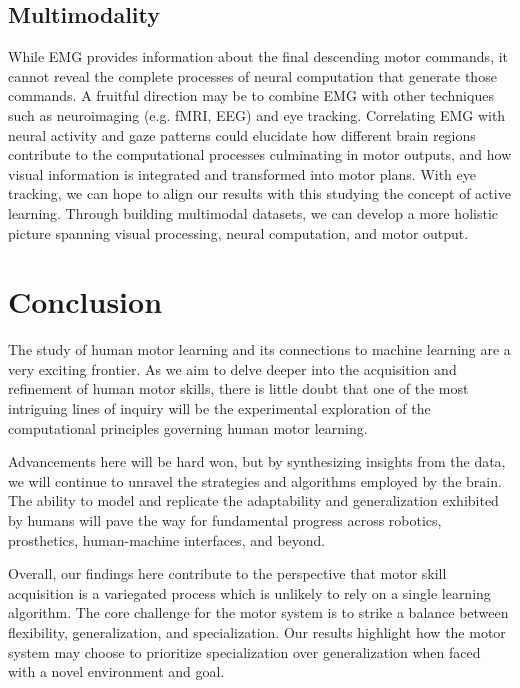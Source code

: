 \documentclass[../main.tex]{subfiles}
\begin{document}


\subsection{Multimodality}

While EMG provides information about the final descending motor commands, it cannot reveal the complete processes of neural computation that generate those commands. A fruitful direction may be to combine EMG with other techniques such as neuroimaging (e.g. fMRI, EEG) and eye tracking. Correlating EMG with neural activity and gaze patterns could elucidate how different brain regions contribute to the computational processes culminating in motor outputs, and how visual information is integrated and transformed into motor plans. With eye tracking, we can hope to align our results with this studying the concept of active learning\cite{yangTheoreticalPerspectivesActive2016,huangActiveLearningLearning2008}. Through building multimodal datasets, we can develop a more holistic picture spanning visual processing, neural computation, and motor output.








\section{Conclusion} %

The study of human motor learning and its connections to machine learning are a very exciting frontier. As we aim to delve deeper into the acquisition and refinement of human motor skills, there is little doubt that one of the most intriguing lines of inquiry will be the experimental exploration of the computational principles governing human motor learning. 

Advancements here will be hard won, but by synthesizing insights from the data, we will continue to unravel the strategies and algorithms employed by the brain. The ability to model and replicate the adaptability and generalization exhibited by humans will pave the way for fundamental progress across robotics, prosthetics, human-machine interfaces, and beyond.

Overall, our findings here contribute to the perspective that motor skill acquisition is a variegated process which is unlikely to rely on a single learning algorithm. The core challenge for the motor system is to strike a balance between flexibility, generalization, and specialization. Our results highlight how the motor system may choose to prioritize specialization over generalization when faced with a novel environment and goal. 
\end{document}
